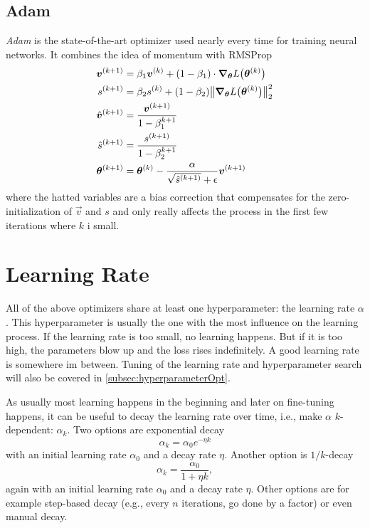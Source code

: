 		\subsection{Adam}
			\emph{Adam} is the state-of-the-art optimizer used nearly every time for training neural networks. It combines the idea of momentum with RMSProp
			\begin{align}
				\bm{v}^{(k + 1)}       & = \beta_1 \bm{v}^{(k)} + (1 - \beta_1) \cdot \grad_{\bm{\theta}} L\bigl(\bm{\theta}^{(k)}\bigr)               \\
				s^{(k + 1)}             & = \beta_2 s^{(k)} + (1 - \beta_2) \big\lVert \grad_{\bm{\theta}} L\bigl(\bm{\theta}^{(k)}\bigr) \big\rVert_2^2 \\
				\hat{\bm{v}}^{(k + 1)} & = \frac{\bm{v}^{(k + 1)}}{1 - \beta_1^{k + 1}}                                                                  \\
				\hat{s}^{(k + 1)}       & = \frac{s^{(k + 1)}}{1 - \beta_2^{k + 1}}                                                                        \\
				\bm{\theta}^{(k + 1)}  & = \bm{\theta}^{(k)} - \frac{\alpha}{\sqrt{\hat{s}^{(k + 1)}} + \epsilon} \bm{v}^{(k + 1)}
			\end{align}
			where the hatted variables are a bias correction that compensates for the zero-initialization of \(\vec{v}\) and \(s\) and only really affects the process in the first few iterations where \(k\) i small.

	\section{Learning Rate}
		All of the above optimizers share at least one hyperparameter: the learning rate \(\alpha\). This hyperparameter is usually the one with the most influence on the learning process. If the learning rate is too small, no learning happens. But if it is too high, the parameters blow up and the loss rises indefinitely. A good learning rate is somewhere im between. Tuning of the learning rate and hyperparameter search will also be covered in \autoref{subsec:hyperparameterOpt}.

		As usually most learning happens in the beginning and later on fine-tuning happens, it can be useful to decay the learning rate over time, i.e., make \(\alpha\) \(k\)-dependent: \(\alpha_k\). Two options are exponential decay
		\begin{equation}
			\alpha_k = \alpha_0 e^{-\eta k}
		\end{equation}
		with an initial learning rate \(\alpha_0\) and a decay rate \(\eta\). Another option is \(1/k\)-decay
		\begin{equation}
			\alpha_k = \frac{\alpha_0}{1 + \eta k},
		\end{equation}
		again with an initial learning rate \(\alpha_0\) and a decay rate \(\eta\). Other options are for example step-based decay (e.g., every \(n\) iterations, go done by a factor) or even manual decay.

